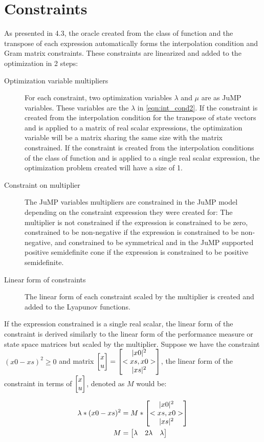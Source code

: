 \section{Constraints}
As presented in 4.3, the oracle created from the class of function and the transpose of each expression automatically forms the interpolation condition and Gram matrix constraints. These constraints are linearized and added to the optimization in 2 steps:
\begin{description}
    \item [Optimization variable multipliers] For each constraint, two optimization variables $\lambda$ and $\mu$ are as JuMP variables. These variables are the $\lambda$ in \ref{eqn:int_cond2}. If the constraint is created from the interpolation condition for the transpose of state vectors and is applied to a matrix of real scalar expressions, the optimization variable will be a matrix sharing the same size with the matrix constrained. If the constraint is created from the interpolation conditions of the class of function and is applied to a single real scalar expression, the optimization problem created will have a size of 1.
    \item [Constraint on multiplier] The JuMP variables multipliers are constrained in the JuMP model depending on the constraint expression they were created for: The multiplier is not constrained if the expression is constrained to be zero, constrained to be non-negative if the expression is constrained to be non-negative, and constrained to be symmetrical and in the JuMP supported positive semidefinite cone if the expression is constrained to be positive semidefinite.
    \item [Linear form of constraints] The linear form of each constraint scaled by the multiplier is created and added to the Lyapunov functions.
\end{description}

If the expression constrained is a single real scalar, the linear form of the constraint is derived similarly to the linear form of the performance measure or state space matrices but scaled by the multiplier. Suppose we have the constraint $(x0 - xs)^2 \geq 0$ and matrix $\begin{bmatrix}x\\ u\end{bmatrix} = \begin{bmatrix}|x0|^2\\ <xs, x0>\\ |xs|^2\end{bmatrix}$, the linear form of the constraint in terms of $\begin{bmatrix}x\\ u\end{bmatrix}$, denoted as $M$ would be:

\begin{subequations} \label{eqn:constraint_single}
	\begin{align}
    \lambda * (x0 - xs)^2 &= M * \begin{bmatrix}|x0|^2\\ <xs, x0>\\ |xs|^2\end{bmatrix} \label{eq_cons_single1}       \\
	M &= \begin{bmatrix}\lambda& 2\lambda & \lambda\end{bmatrix} \label{eq_cons_single2}
	\end{align}
\end{subequations}

